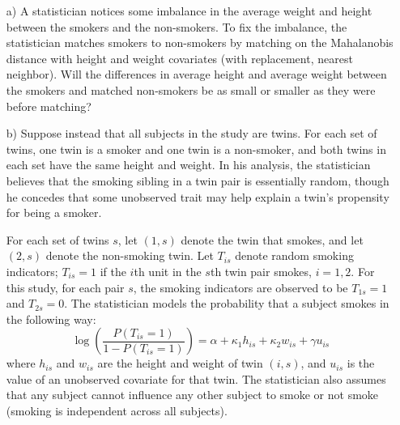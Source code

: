 \documentclass{article}
\begin{document}
\begin{itemize}
\begin{itemize}
        \item[a)]
          A statistician notices some imbalance in the average weight and height 
          between the smokers and the non-smokers.         
          To fix the imbalance, the statistician matches smokers
          to non-smokers by matching 
          on the Mahalanobis distance with height and weight covariates          
          (with replacement, nearest neighbor).
          Will the differences in average height and average
          weight between the smokers
          and matched non-smokers            
          be as small or smaller as they were before matching?
        \item[b)]
          Suppose instead that all subjects in the study are twins.
          For each set of twins, one twin is a smoker and one twin is a non-smoker,
          and both twins in each set have the same height and weight.
          In his analysis, the statistician believes that 
          the smoking sibling in a twin pair 
          is essentially random, though he concedes
          that some unobserved trait may help explain a twin's 
          propensity for being a smoker.
           
          For each set of twins $s$, let $(1,s)$ denote the twin that smokes,
          and let $(2,s)$ denote the non-smoking twin.
          Let $T_{is}$ denote random smoking indicators;
          $T_{is} = 1$ if the $i$th unit in the $s$th twin pair smokes, $i = 1,2$.
          For this study, for each pair $s$, 
          the smoking indicators are observed to be $T_{1s} = 1$
          and $T_{2s} = 0$.
          The statistician models the probability that a subject smokes in the following way:
          \begin{equation}
            \log\left( 
              \frac{P(T_{is} = 1)}{1 - P(T_{is} = 1)}
            \right) = \alpha + \kappa_1 h_{is} + \kappa_2 w_{is} + \gamma u_{is}
            \label{probassign}
          \end{equation}
          where $h_{is}$ and $w_{is}$ are the height and weight of twin $(i,s)$,
          and $u_{is}$ is the value of an unobserved covariate for that twin.
          The statistician also assumes that any subject cannot influence
          any other subject to smoke or not smoke
          (smoking is independent across all subjects).
           

\end{itemize}
\end{itemize}
\end{document}
